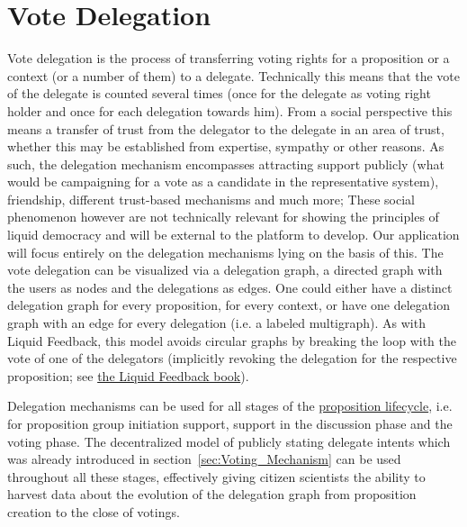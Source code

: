 \section{Vote Delegation}
\label{sec:Model_VoteDelegation}
Vote delegation is the process of transferring voting rights for a proposition or a context (or a number of them) to a delegate.
Technically this means that the vote of the delegate is counted several times (once for the delegate as voting right holder and once for each delegation towards him).
From a social perspective this means a transfer of trust from the delegator to the delegate in an area of trust, whether this may be established from expertise, sympathy or other reasons.
As such, the delegation mechanism encompasses attracting support publicly (what would be campaigning for a vote as a candidate in the representative system), friendship, different trust-based mechanisms and much more; These social phenomenon however are not technically relevant for showing the principles of liquid democracy and will be external to the platform to develop.
Our application will focus entirely on the delegation mechanisms lying on the basis of this.
The vote delegation can be visualized via a delegation graph, a directed graph with the users as nodes and the delegations as edges.
One could either have a distinct delegation graph for every proposition, for every context, or have one delegation graph with an edge for every delegation (i.e. a labeled multigraph). 
As with Liquid Feedback, this model avoids circular graphs by breaking the loop with the vote of one of the delegators (implicitly revoking the delegation for the respective proposition; see \href{http://principles.liquidfeedback.org/}{the Liquid Feedback book}).

Delegation mechanisms can be used for all stages of the \hyperref[sec:Model_Propositions]{proposition lifecycle}, i.e. for proposition group initiation support, support in the discussion phase and the voting phase.
The decentralized model of publicly stating delegate intents which was already introduced in section~\ref{sec:Voting_Mechanism} can be used throughout all these stages, effectively giving citizen scientists the ability to harvest data about the evolution of the delegation graph from proposition creation to the close of votings.



